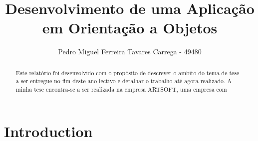\documentclass[sigplan]{acmart}
\begin{document}
\title{Desenvolvimento de uma Aplicação em Orientação a Objetos}


\author{Pedro Miguel Ferreira Tavares Carrega - 49480}


\renewcommand{\shortauthors}{Pedro Miguel Ferreira Tavares Carrega - 49480}

\begin{abstract}
  Este relatório foi desenvolvido com o propósito de descrever o ambito do tema de tese a ser entregue no fim deste ano lectivo e detalhar o trabalho até agora realizado. A minha tese encontra-se a ser realizada na empresa ARTSOFT, uma empresa com 
\end{abstract}




\maketitle

\section{Introduction}



\end{document}
